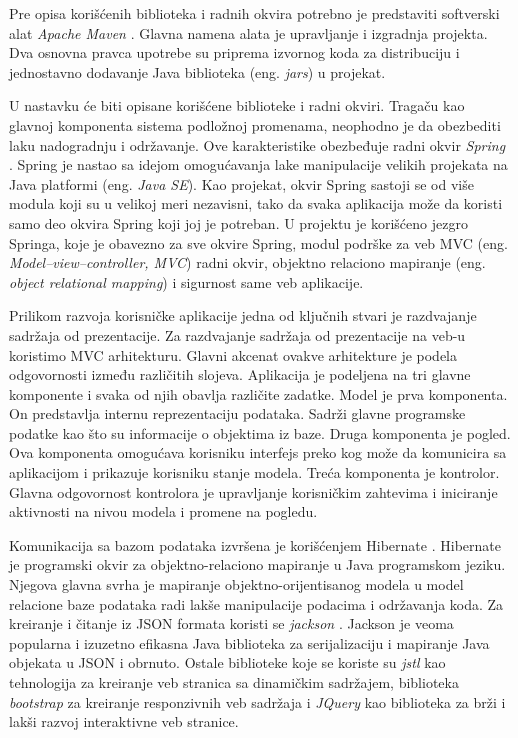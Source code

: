 \documentclass[12pt,oneside]{memoir}
\begin{document}
Pre opisa korišćenih biblioteka i radnih okvira potrebno je predstaviti softverski alat \textit{Apache Maven} \cite{Maven}. Glavna namena alata je upravljanje i izgradnja projekta. Dva osnovna pravca upotrebe su priprema izvornog koda za distribuciju i jednostavno dodavanje Java biblioteka (eng. \textit{jars}) u projekat. 

U nastavku će biti opisane korišćene biblioteke i radni okviri. Tragaču kao glavnoj komponenta sistema podložnoj promenama, neophodno je da obezbediti laku nadogradnju i održavanje. Ove karakteristike obezbeđuje radni okvir \textit{Spring} \cite{Spring}. Spring je nastao sa idejom omogućavanja lake manipulacije velikih projekata na Java platformi (eng. \textit{Java SE}). Kao projekat, okvir Spring sastoji se od više modula koji su u velikoj meri nezavisni, tako da svaka aplikacija može da koristi samo deo okvira Spring koji joj je potreban. U projektu je korišćeno jezgro Springa, koje je obavezno za sve okvire Spring, modul podrške za veb MVC (eng. \textit{Model–view–controller, MVC}) radni okvir, objektno relaciono mapiranje (eng. \textit{object relational mapping}) i sigurnost same veb aplikacije.

Prilikom razvoja korisničke aplikacije jedna od ključnih stvari je razdvajanje sadržaja od prezentacije. Za razdvajanje sadržaja od prezentacije na veb-u koristimo MVC arhitekturu. Glavni akcenat ovakve arhitekture je podela odgovornosti između različitih slojeva. Aplikacija je podeljena na tri glavne komponente i svaka od njih obavlja različite zadatke. Model je prva komponenta. On predstavlja internu reprezentaciju podataka. Sadrži glavne programske podatke kao što su informacije o objektima iz baze. Druga komponenta je pogled. Ova komponenta omogućava korisniku interfejs preko kog može da komunicira sa aplikacijom i prikazuje korisniku stanje modela. Treća komponenta je kontrolor. Glavna odgovornost kontrolora je upravljanje korisničkim zahtevima i iniciranje aktivnosti na nivou modela i promene na pogledu. 

Komunikacija sa bazom podataka izvršena je korišćenjem Hibernate \cite{Hibernate}. Hibernate je programski okvir za objektno-relaciono mapiranje u Java programskom jeziku. Njegova glavna svrha je mapiranje objektno-orijentisanog modela u model relacione baze podataka radi lakše manipulacije podacima i održavanja koda. Za kreiranje i čitanje iz JSON formata koristi se \textit{jackson} \cite{Jackson}. Jackson je veoma popularna i izuzetno efikasna Java biblioteka za serijalizaciju i mapiranje Java objekata u JSON i obrnuto. Ostale biblioteke koje se koriste su \textit{jstl} \cite{JSTL} kao tehnologija za kreiranje veb stranica sa dinamičkim sadržajem, biblioteka \textit{bootstrap} \cite{Bootstrap} za kreiranje responzivnih veb sadržaja i \textit{JQuery} \cite{JQuery} kao biblioteka za brži i lakši razvoj interaktivne veb stranice. 
\end{document}
